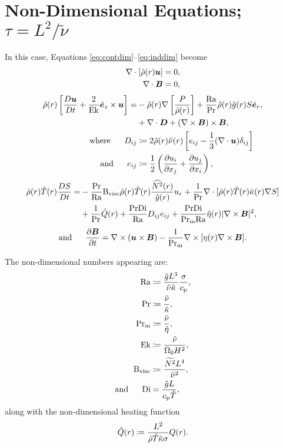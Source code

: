\documentclass[12pt]{article}
\numberwithin{equation}{section}
\newcommand{\rhond}{\hat{\rho}}
\newcommand{\tmpnd}{\hat{T}}
\newcommand{\gnd}{\hat{g}}
\newcommand{\nund}{\hat{\nu}}
\newcommand{\kappand}{\hat{\kappa}}
\newcommand{\etand}{\hat{\eta}}
\begin{document}
	\section{Non-Dimensional Equations; $\tau=L^2/\tilde{\nu}$}
	In this case, Equations \eqref{eq:contdim}--\eqref{eq:inddim} become 
	\begin{align}
	\Div[\rhond\ofr\vecu] &= 0\label{eq:contndvisc},\\
	\Div \vecb &= 0,
\end{align}
\begin{subequations}\label{eq:momndvisc}
	\begin{align}
		\rhond\ofr\left[\matderiv{\vecu}+\frac{2}{\ek}\ez\times\vecu\right] = &-\rhond\ofr\nabla\left[ \frac{P}{\rhond\ofr} \right] + \frac{\ra}{\pr}\rhond\ofr\gnd\ofr S\er, \nonumber\\
		&+\Div\bm{D} +(\curl\vecb)\times\vecb,\\
		\where D_{ij} &\define 2\rhond\ofr\nund\ofr \left[e_{ij} - \frac{1}{3}(\Div\vecu) \delta_{ij} \right]\\
		\andd e_{ij} &\define \frac{1}{2}\left(\pderiv{u_i}{x_j} + \pderiv{u_j}{x_i} \right),
	\end{align}
\end{subequations}
\begin{align}\label{eq:enndvisc}
	\rhond\ofr\tmpnd\ofr \matderiv{S} = &- \frac{\pr}{\ra}\bvisc\rhond\ofr\tmpnd\ofr \frac{\widehat{N^2}\ofr}{\hat{g}\ofr} \ur + \frac{1}{\pr} \Div[\rhond\ofr \tmpnd\ofr \kappand\ofr \nabla S] \nonumber \\
	&+ \frac{1}{\pr} \hat{Q}(r) + \frac{\pr\di}{\ra} D_{ij}e_{ij} + \frac{\pr\di}{\prm\ra} \etand\ofr|\curl\vecb|^2,
\end{align}
\begin{align}\label{eq:indndvisc}
	\text{and}\ \ \ \ \  \frac{\partial\bm{B}}{\partial t} = \nabla\times(\bm{u}\times\bm{B}) - \frac{1}{{\rm{Pr_m}}} \nabla\times[\eta(r)\nabla\times\bm{B}].
\end{align}	

The non-dimensional numbers appearing are:
\begin{subequations}
\begin{align}
	{\rm{Ra}} &\coloneqq \frac{\tilde{g} L^3}{\tilde{\nu} \tilde{\kappa}} \frac{\sigma}{c_{\rm{p}}},\\ 
	{\rm{Pr}} &\coloneqq \frac{\tilde{\nu}}{\tilde{\kappa}},\\
	{\rm{Pr_m}} &\coloneqq \frac{\tilde{\nu}}{\tilde{\eta}},\\
	{\rm{Ek}} &\coloneqq \frac{\tilde{\nu}}{\Omega_0H^2},\\	
	{\rm{B_{visc}}} &\coloneqq \frac{\widetilde{N^2}L^4}{\tilde{\nu}^2},\\
	\text{and}\ \ \ \ \  {\rm{Di}} &= \frac{\tilde{g}L}{c_{\rm{p}}\tilde{T}},
\end{align}
\end{subequations}
along with the non-dimensional heating function
\begin{align}\label{eq:qnd}
	\hat{Q}(r) \coloneqq \frac{L^2}{\tilde{\rho}\tilde{T}\tilde{\kappa} \sigma} Q(r). 
\end{align}
\end{document}
